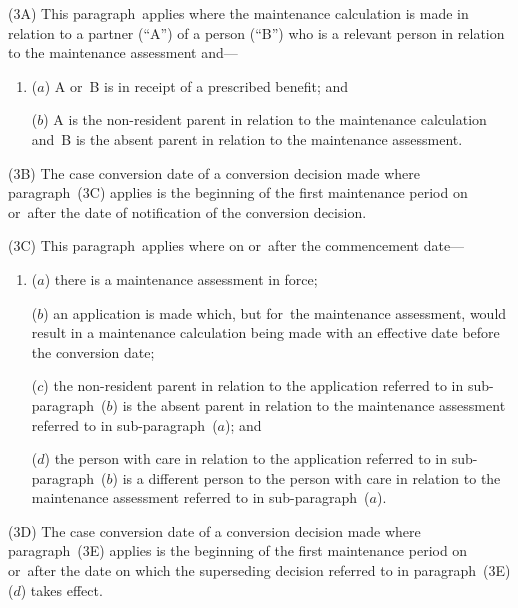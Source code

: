 \documentclass[12pt,a4paper]{article}
\begin{document}
(3A) This paragraph~applies where the maintenance calculation is made in relation to a partner (“A”) of a person (“B”) who is a relevant person in relation to the maintenance assessment and—
\begin{enumerate}\item[]
($a$) A or~B is in receipt of a prescribed benefit; and

%

($b$) A is the non-resident parent in relation to the maintenance calculation and~B is the absent parent in relation to the maintenance assessment.
\end{enumerate}

(3B) The case conversion date of a conversion decision made where paragraph~(3C) applies is the beginning of the first maintenance period on or~after the date of notification of the conversion decision.

(3C) This paragraph~applies where on or~after the commencement date—
\begin{enumerate}\item[]
($a$) there is a maintenance assessment in force;

($b$) an application is made 
which, but for~the maintenance assessment, would result in a maintenance calculation being made with an effective date before the conversion date;

($c$) the non-resident parent in relation to the application referred to in sub-paragraph~($b$)  is the absent parent in relation to the maintenance assessment referred to in sub-paragraph~($a$); and

($d$) the person with care in relation to the application referred to in sub-paragraph~($b$)  is a different person to the person with care in relation to the maintenance assessment referred to in sub-paragraph~($a$).
\end{enumerate}

(3D) The case conversion date of a conversion decision made where paragraph~(3E) applies is the beginning of the first maintenance period on or~after the date on which the superseding decision referred to in paragraph~(3E)($d$)  takes effect.
\end{document}
